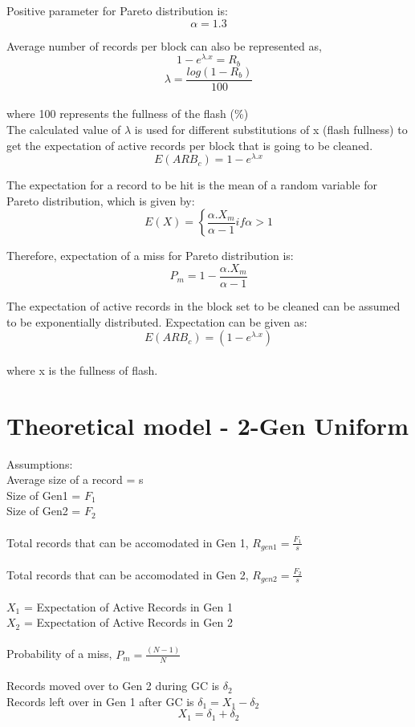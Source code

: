 Positive parameter for Pareto distribution is: 
$$\alpha = 1.3 $$


Average number of records per block can also be represented as, 
$$1-e^{\lambda . x} = R_b$$
$$\lambda = \frac{log(1 - R_b)}{100}$$\\
where 100 represents the fullness of the flash (\%)\\

The calculated value of $\lambda$ is used for different substitutions of x (flash fullness)  to get the expectation of active records per block that is going to be cleaned.
$$E(ARB_c) = 1-e^{\lambda . x}$$

The expectation for a record to be hit is the mean of a random variable for Pareto distribution, which is given by:\\
$$E(X) = \left\{\frac{\alpha . X_m}{\alpha - 1} \right.  if \alpha > 1$$

Therefore, expectation of a miss for Pareto distribution is:
$$P_m = 1 - \frac{\alpha . X_m}{\alpha - 1} $$

The expectation of active records in the block set to be cleaned can be assumed to be exponentially distributed. Expectation can be given as: $$E(ARB_c) = (1 - e^{\lambda . x})$$\\
where x is the fullness of flash.
\\


\section{Theoretical model - 2-Gen Uniform}
Assumptions:\\
Average size of a record = s\\
Size of Gen1 = $F_1$\\
Size of Gen2 = $F_2$\\
\\
Total records that can be accomodated in Gen 1, $R_{gen1} = \frac{F_1}{s} $\\
\\
Total records that can be accomodated in Gen 2, $R_{gen2} = \frac{F_2}{s}$\\
\\
$X_1$ = Expectation of Active Records in Gen 1\\
$X_2$ = Expectation of Active Records in Gen 2\\
\\
Probability of a miss, $P_m = \frac{(N - 1)}{N}$\\
\\
Records moved over to Gen 2 during GC is $\delta_2$\\
Records left over in Gen 1 after GC is $\delta_1 = X_1 - \delta_2$\\
\begin{equation}X_1 = \delta_1 + \delta_2\end{equation}

